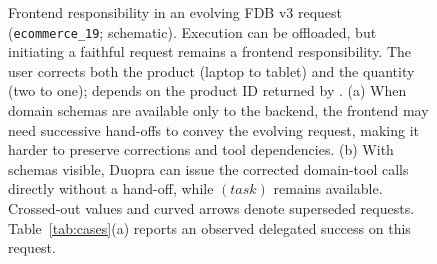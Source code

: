 \begin{figure}[t]
\centering
{}
\caption{Frontend responsibility in an evolving FDB v3 request
(\texttt{ecommerce\_19}; schematic). Execution can be offloaded, but
initiating a faithful request remains a frontend responsibility.
The user corrects both the product (laptop to tablet) and the
quantity (two to one);  depends on the product
ID returned by .
(a) When domain schemas are available only to the backend,
the frontend may need successive hand-offs to convey the evolving
request, making it harder to preserve corrections and tool
dependencies.
(b) With schemas visible, Duopra can issue the corrected
domain-tool calls directly without a hand-off, while
$(\textit{task})$ remains available.
Crossed-out values and curved arrows denote superseded requests.
Table~\ref{tab:cases}(a) reports an observed delegated success
on this request.}

\label{fig:timeline}
\end{figure}
